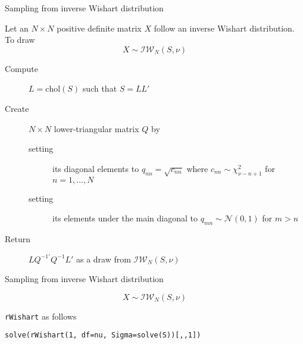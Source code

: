 \documentclass[notes,blackandwhite,mathsans,usenames,dvipsnames]{beamer}
\begin{document}
\begin{frame}{Sampling from inverse Wishart distribution}

{\color{mcxs2}Let an} $N\times N$ {\color{mcxs2}positive definite matrix} $X$ {\color{mcxs2}follow an inverse Wishart distribution. To draw} 
$$ X\sim\mathcal{IW}_{N}(S,\nu) $$

\begin{description}
\item[Compute] $L=\text{chol}(S)$ {\color{mcxs2}such that}  $S = LL'$

\bigskip\item[Create] $N\times N$ {\color{mcxs2}lower-triangular matrix} $Q$ {\color{mcxs2}by}
	\begin{description}
	\item[setting] {\color{mcxs2}its diagonal elements to} $q_{nn}=\sqrt{c_{nn}}$ {\color{mcxs2}where} $c_{nn}\sim\chi^2_{\nu-n+1}$ {\color{mcxs2}for} $n=1,\dots,N$
	\item[setting] {\color{mcxs2}its elements under the main diagonal to} $q_{mn}\sim\mathcal{N}(0,1)$ {\color{mcxs2}for} $m>n$
	\end{description}

\bigskip\item[Return] $LQ^{-1\prime}Q^{-1}L'$ {\color{mcxs2}as a draw from} $\mathcal{IW}_{N}(S,\nu)$
\end{description}


\end{frame}




\begin{frame}{Sampling from inverse Wishart distribution}


$$ X\sim\mathcal{IW}_{N}(S,\nu) $$

 \texttt{rWishart} {\color{mcxs2}as follows} \footnotesize

\bigskip\texttt{solve(rWishart(1, df=nu, Sigma=solve(S))[,,1])}

\end{frame}
\end{document}
